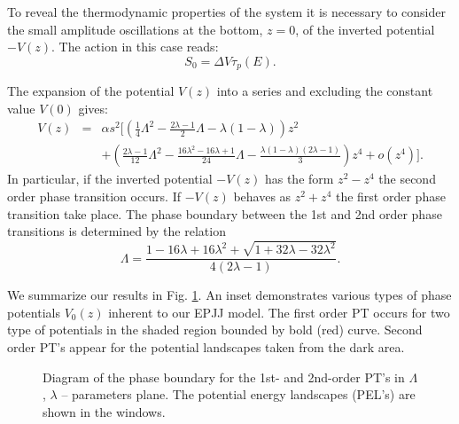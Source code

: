\documentclass[aps, pre, preprint, groupedaddress, superscriptaddress, showkeys, showpacs] {revtex4-1}
\begin{document}
To reveal the thermodynamic properties of the system it is necessary to consider the small amplitude oscillations at the bottom, $z=0$, of the inverted potential $-V(z)$.
The action in this case reads: 
%
\begin{equation}
S_0 = \Delta V \tau_p (E).
\label{eq:thermal_action}
\end{equation}
%

The expansion of the potential $V(z)$ into a series and excluding the constant value $V(0)$ gives:
%
\begin{equation}
\begin{array}{lcl}
V(z) & = & \alpha s^2 \Big[ \left( \frac{1}{4} \Lambda^2  - \frac{2\lambda - 1}{2} \Lambda - \lambda (1 - \lambda) \right) z^2 \\
&& + \left( \frac{2\lambda - 1}{12} \Lambda^2 - \frac{16\lambda^2 - 16\lambda + 1}{24} \Lambda - \frac{\lambda (1 - \lambda) (2\lambda - 1)}{3} \right) z^4 + o(z^4) \Big].
\end{array}
\label{eq:potential_teylor}
\end{equation}
%
In particular, if the inverted potential $-V(z)$ has the form $z^2 - z^4$ the second order phase transition occurs.
If $-V(z)$ behaves as $z^2 + z^4$ the first order phase transition take place.
The phase boundary between the 1st and 2nd order phase transitions is determined by the relation
%
\begin{equation}
\Lambda = \frac{1 - 16\lambda + 16\lambda^2 + \sqrt{1 + 32\lambda - 32\lambda^2}}{4(2\lambda - 1)}.
\label{eq:order_border}
\end{equation}
%

We summarize our results in Fig. \ref{pic:phase_boundary_combined}. An inset demonstrates various types of  phase potentials $V_0(z)$ inherent to our EPJJ model. The first order PT occurs for two type of potentials in the shaded region bounded by bold  (red) curve.  Second order PT's appear for the potential landscapes taken from the dark area. 
%
\begin{figure}[ht]
\caption{Diagram of the phase boundary for the 1st- and 2nd-order PT's in $\Lambda$, $\lambda$ -- parameters plane.
The potential energy landscapes (PEL's) are shown in the windows. \label{pic:phase_boundary_combined}}
\end{figure}
%
\end{document}
